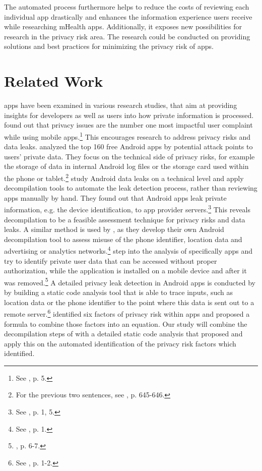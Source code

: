 \documentclass[
	a4paper,
	oneside,
	12pt,
	liststotocnumbered
]{article}
\let\cite\textcite
\begin{document}
The automated process furthermore helps to reduce the costs of reviewing each individual app drastically and enhances the information experience users receive while researching mHealth apps.
Additionally, it exposes new possibilities for research in the privacy risk area. The research could be conducted on providing solutions and best practices for minimizing the privacy risk of apps.

\section{Related Work}
\mH apps have been examined in various research studies, that aim at providing insights for developers as well as users into how private information is processed.
\cite{Khalid2015} found out that privacy issues are the number one most impactful user complaint while using mobile apps.\footnote{See \cite{Khalid2015}, p. 5.}
This encourages research to address privacy risks and data leaks.
\cite{He2014} analyzed the top 160 free Android \mH apps by potential attack points to users' private data. They focus on the technical side of privacy risks, for example the storage of \mH data in internal Android log files or the storage card used within the phone or tablet.\footnote{For the previous two sentences, see \cite{He2014}, p. 645-646.}
\cite{Mcclurg2012} study Android data leaks on a technical level and apply decompilation tools to automate the leak detection process, rather than reviewing apps manually by hand. They found out that Android apps leak private information, e.g. the device identification, to app provider servers.\footnote{See \cite{Mcclurg2012}, p. 1, 5.}
This reveals decompilation to be a feasible assessment technique for privacy risks and data leaks.
A similar method is used by \cite{Enck2011}, as they develop their own Android decompilation tool to assess misuse of the phone identifier, location data and advertising or analytics networks.\footnote{See \cite{Enck2011}, p. 1.}
\cite{Mitchell2013} step into the analysis of specifically \mH apps and try to identify private user data that can be accessed without proper authorization, while the application is installed on a mobile device and after it was removed.\footnote{\cite{Mitchell2013}, p. 6-7.}
A detailed privacy leak detection in Android apps is conducted by \cite{Kim2012} by building a static code analysis tool that is able to trace inputs, such as location data or the phone identifier to the point where this data is sent out to a remote server.\footnote{See \cite{Kim2012}, p. 1-2.}
\cite{Bruggemann2016} identified six factors of privacy risk within \mH apps and proposed a formula to combine those factors into an equation.
Our study will combine the decompilation steps of \cite{Enck2011} with a detailed static code analysis that \cite{Kim2012} proposed and apply this on the automated identification of the privacy risk factors which \cite{Bruggemann2016} identified.
\end{document}
